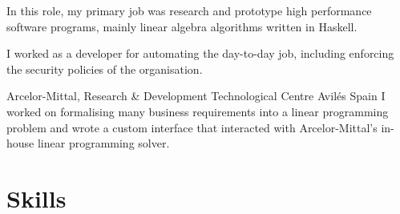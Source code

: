 \documentclass[11pt,a4paper,sans]{moderncv}        %
\begin{document}
{In this role, my primary job was  research and prototype high performance software programs, mainly linear algebra algorithms
written in Haskell.}

{I worked as a developer for automating the day-to-day job,  including enforcing the security policies of the organisation.}

 {Arcelor-Mittal, Research \& Development Technological Centre} {Avil{\'e}s} {Spain} 
{I worked on formalising many business requirements into a linear programming problem and wrote a 
 custom interface that interacted with Arcelor-Mittal's in-house linear programming solver.}


\section{Skills}



\end{document}
